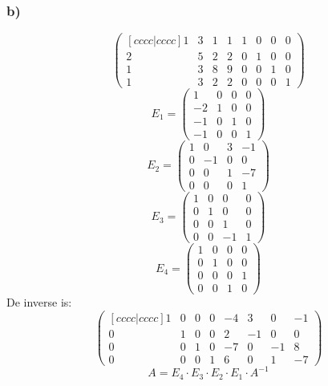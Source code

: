 \documentclass[lineaire_algebra_oplossingen.tex]{subfiles}
\begin{document}
\subsubsection*{b)}
\[
\begin{pmatrix}[cccc|cccc]
1 & 3 & 1 & 1 & 1 & 0 & 0 & 0\\
2 & 5 & 2 & 2 & 0 & 1 & 0 & 0\\
1 & 3 & 8 & 9 & 0 & 0 & 1 & 0\\
1 & 3 & 2 & 2 & 0 & 0 & 0 & 1
\end{pmatrix}
\]
\[ E_1 =
\begin{pmatrix}
1 & 0 & 0 & 0\\
-2 & 1 & 0 & 0\\
-1 & 0 & 1 & 0\\
-1 & 0 & 0 & 1
\end{pmatrix}
\]
\[ E_2 =
\begin{pmatrix}
1 & 0 & 3 & -1\\
0 & -1 & 0 & 0\\
0 & 0 & 1 & -7\\
0 & 0 & 0 & 1
\end{pmatrix}
\]
\[ E_3 =
\begin{pmatrix}
1 & 0 & 0 & 0\\
0 & 1 & 0 & 0\\
0 & 0 & 1 & 0\\
0 & 0 & -1 & 1
\end{pmatrix}
\]
\[ E_4 =
\begin{pmatrix}
1 & 0 & 0 & 0\\
0 & 1 & 0 & 0\\
0 & 0 & 0 & 1\\
0 & 0 & 1 & 0
\end{pmatrix}
\]
De inverse is:
\[
\begin{pmatrix}[cccc|cccc]
1 & 0 & 0 & 0 & -4 & 3 & 0 & -1\\
0 & 1 & 0 & 0 & 2 & -1 & 0 & 0\\
0 & 0 & 1 & 0 & -7 & 0 & -1 & 8\\
0 & 0 & 0 & 1 & 6 & 0 & 1 & -7
\end{pmatrix}
\]
\[ A = E_4 \cdot E_3 \cdot E_2 \cdot E_1 \cdot A^{-1} \]
\end{document}
